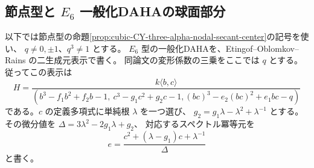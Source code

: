 \subsection{節点型と $E_6$ 一般化DAHAの球面部分}
\label{subsec:cubic-CY-three-alpha-nodal-E6}

以下では節点型の命題\ref{prop:cubic-CY-three-alpha-nodal-secant-center}の記号を使い、
$q\ne0,\pm1$、$q^3\ne1$ とする。
$E_6$ 型の一般化DAHAを、Etingof--Oblomkov--Rains
\cite[第8.1節]{EtingofOblomkovRainsGDaha}の二生成元表示で書く。
同論文の変形係数の三乗をここでは $q$ とする。
従ってこの表示は
\[
 H=\frac{k\langle b,c\rangle}
 {(b^3-f_1b^2+f_2b-1,\ c^3-g_1c^2+g_2c-1, (bc)^3-e_2(bc)^2+e_1bc-q)}
\]
である。$c$ の定義多項式に単純根 $\lambda$ を一つ選び、
$g_2=g_1\lambda-\lambda^2+\lambda^{-1}$ とする。
その微分値を $\Delta=3\lambda^2-2g_1\lambda+g_2$、
対応するスペクトル冪等元を
\[
 e=\frac{c^2+(\lambda-g_1)c+\lambda^{-1}}{\Delta}
\]
と書く。

